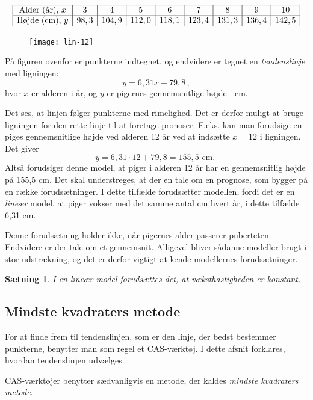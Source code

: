 \documentclass[12pt,oneside,a4paper]{article}
\newtheorem{thm}{Sætning}[section]
\begin{document}
\[
\begin{array}{|c|c|c|c|c|c|c|c|c|}
    \hline
    \mbox{Alder (år)},\, x &  3 &  4 &  5 &  6 &  7 &  8 & 9 & 10 \\
    \hline
    \mbox{Højde (cm)},\, y &  98,3 &   104,9 &  112,0 &  118,1 &  123,4 &  131,3 & 136,4 & 142,5\\
    \hline
\end{array}
\]

\begin{figure}[H]
    \centering
    \texttt{[image: lin-12]}
\end{figure}

På figuren ovenfor er punkterne indtegnet, og endvidere er tegnet en {\em
tendenslinje} med ligningen:
\[
    y = 6,31 x + 79,8 \,,
\]
hvor $x$ er alderen i år, og $y$ er pigernes gennemsnitlige højde i cm.

Det ses, at linjen følger punkterne med rimelighed. Det er derfor muligt at
bruge ligningen for den rette linje til at foretage pronoser. F.eks. kan man
forudsige en piges gennemsnitlige højde ved alderen 12 år ved at indsætte $x=12$
i ligningen. Det giver
\[
    y=6,31\cdot 12 + 79,8 = 155,5 \mbox{ cm. }
\]
Altså forudsiger denne model, at piger i alderen 12 år har en gennemsnitlig
højde på 155,5 cm.  Det skal understreges, at der en tale om en prognose, som
bygger på en række forudsætninger.  I dette tilfælde forudsætter modellen,
fordi det er en {\em lineær} model, at piger vokser med det samme antal cm
hvert år, i dette tilfælde 6,31 cm.

Denne forudsætning holder ikke, når pigernes alder passerer puberteten.
Endvidere er der tale om et gennemsnit.  Alligevel bliver sådanne modeller brugt
i stor udstrækning, og det er derfor vigtigt at kende modellernes
forudsætninger. 
\begin{thm}
    I en lineær model forudsættes det, at væksthastigheden er konstant.
\end{thm}

\subsection{Mindste kvadraters metode}

For at finde frem til tendenslinjen, som er den linje, der bedst bestemmer
punkterne, benytter man som regel et CAS-værktøj. I dette afsnit forklares,
hvordan tendenslinjen udvælges.

CAS-værktøjer benytter sædvanligvis en metode, der kaldes {\em mindste
kvadraters metode}.
\end{document}
